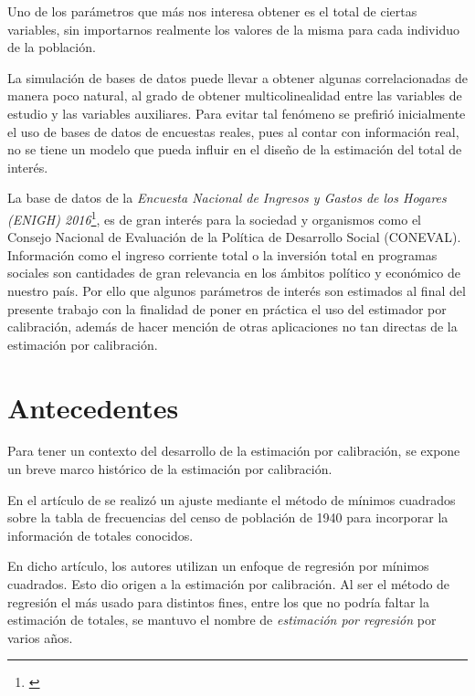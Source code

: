 \documentclass[a4paper,twoside,openright,12pt]{book}
\theoremstyle{definition}
\numberwithin{equation}{chapter}
\numberwithin{figure}{chapter}
\numberwithin{table}{chapter}
\numberwithin{theorem}{chapter}
\numberwithin{lemma}{chapter}
\begin{document}
Uno de los parámetros que más nos interesa obtener es el total de ciertas variables, sin importarnos realmente los valores de la misma para cada individuo de la población.

La simulación de bases de datos puede llevar a obtener algunas correlacionadas de manera poco natural, al grado de obtener multicolinealidad entre las variables  de estudio y las variables auxiliares. Para evitar tal fenómeno se prefirió inicialmente el uso de bases de datos de encuestas reales, pues al contar con información real, no se tiene un modelo que pueda influir en el diseño de la estimación del total de interés.

La base de datos de la \textsl{Encuesta Nacional de Ingresos y Gastos de los Hogares (ENIGH) 2016}\footnote{\cite{inegi}}, es de gran interés para la sociedad y organismos como el Consejo Nacional de Evaluación de la Política de Desarrollo Social (CONEVAL). Información como el ingreso corriente total o la inversión total en programas sociales son cantidades de gran relevancia en los ámbitos político y económico de nuestro país. Por ello que algunos parámetros de interés son estimados al final del presente trabajo con la finalidad de poner en práctica el uso del estimador por calibración, además de hacer mención de otras aplicaciones no tan directas de la estimación por calibración.
\section*{Antecedentes}
Para tener un contexto del desarrollo de la estimación por calibración, se expone un breve marco histórico de la estimación por calibración.

En el artículo de \cite{CIS-289580} se realizó un ajuste mediante el método de mínimos cuadrados sobre la tabla de frecuencias del censo de población de 1940 para incorporar la información de totales conocidos.

En dicho artículo, los autores utilizan un enfoque de regresión por mínimos cuadrados. Esto dio origen a la estimación por calibración. Al ser el método de regresión el más usado para distintos fines, entre los que no podría faltar la estimación de totales, se mantuvo el nombre de \textsl{estimación por regresión} por varios años.
\end{document}
